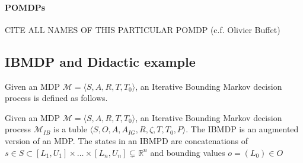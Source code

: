 \paragraph{POMDPs}
CITE ALL NAMES OF THIS PARTICULAR POMDP (c.f. Olivier Buffet)

\subsection{IBMDP and Didactic example}
Given an MDP $\mathcal{M}= \langle S, A, R, T, T_0 \rangle$, an Iterative Bounding Markov decision process is defined as follows.
\begin{definition}
    Given an MDP $\mathcal{M}= \langle S, A, R, T, T_0 \rangle$, an Iterative Bounding Markov decision process $\mathcal{M}_{IB}$ is a tuble $\langle S, O, A, A_{IG}, R, \zeta, T, T_0, P\rangle$.
    The IBMDP is an augmented version of an MDP. The states in an IBMPD are concatenations of $s\in S \subset [L_1, U_1]\times\dots \times [L_n, U_n] \subsetneq \mathbb{R}^n$ and bounding values $o = (L_0) \in O$ 
\end{definition}


